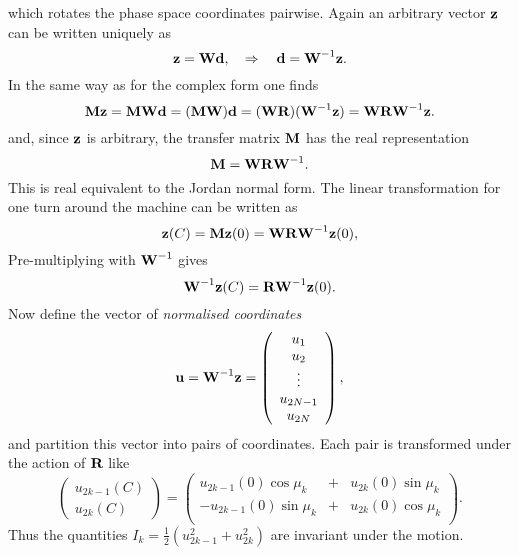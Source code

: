 which rotates the phase space coordinates pairwise.
Again an arbitrary vector $\bold{z}$ can be written uniquely as
\begin{equation}
\bold{z} = \bold{W} \bold{d}, \quad \Rightarrow \quad
\bold{d} = \bold{W}^{-1} \bold{z}.
\end{equation}
In the same way as for the complex form one finds
\begin{equation}
\bold{M} \bold{z} = \bold{M} \bold{W} \bold{d} =
(\bold{M} \bold{W}) \bold{d} =
(\bold{W} \bold{R}) (\bold{W}^{-1} \bold{z}) =
\bold{W} \bold{R} \bold{W}^{-1} \bold{z}.
\end{equation}
and, since $\bold{z}$ is arbitrary,
the transfer matrix $\bold{M}$ has the real
representation
\begin{equation}
\bold{M} = \bold{W} \bold{R} \bold{W}^{-1}.
\end{equation}
This is real equivalent to the Jordan normal form.
The linear transformation for one turn around the machine can be
written as
\begin{equation}
\bold{z}(C) = \bold{M} \bold{z}(0) =
\bold{W} \bold{R} \bold{W}^{-1} \bold{z}(0),
\end{equation}
Pre-multiplying with $\bold{W}^{-1}$ gives
\begin{equation}
\bold{W}^{-1} \bold{z}(C) = \bold{R} \bold{W}^{-1} \bold{z}(0).
\end{equation}
Now define the vector of {\em normalised coordinates}
\begin{equation}
\bold{u} = \bold{W}^{-1} \bold{z} = 
\left( \begin{array}{c}
u_1 \\ u_2 \\ \vdots \\ u_{2N-1} \\ u_{2N}
\end{array} \right),
\end{equation}
and partition this vector into pairs of coordinates.
Each pair is transformed under the action of $\bold{R}$ like
\begin{equation}
\left( \begin{array}{l}
u_{2k-1}(C) \\ u_{2k}(C)
\end{array} \right) = \left( \begin{array}{rcl}
u_{2k-1}(0) \cos\mu_k &+& u_{2k}(0) \sin\mu_k \\
-u_{2k-1}(0) \sin\mu_k &+& u_{2k}(0) \cos\mu_k \\
\end{array} \right).
\end{equation}
Thus the quantities $I_k = \frac{1}{2}(u_{2k-1}^2 + u_{2k}^2)$ are
invariant under the motion.
 

